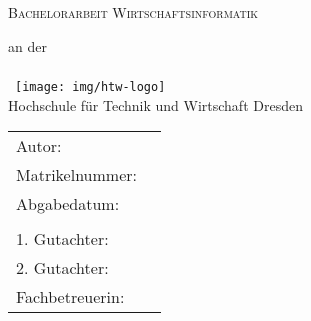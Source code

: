 \begin{titlepage}
\pagestyle{empty}

\hspace{1cm}\\
\,
\vspace{1cm}

\centering

	{
		\scshape
			\Huge \projektname{}
		\par
	}

\vspace{2cm}

{	\scshape	{\LARGE Bachelorarbeit Wirtschaftsinformatik} }

	\vspace{1mm}
	{		\small{an der}\\	}
	\hspace{1cm}\\
	\,
	\vspace{1em}
	{\texttt{[image: img/htw-logo]}
\\%
	{	\large	Hochschule für Technik und Wirtschaft Dresden\\ }
	}

\vfill
	\vspace{2em}


\begin{tabular}{ll}%
	Autor: & \Author{} \\
	Matrikelnummer: & \AuthorID{} \\
	Abgabedatum: & \DocDate{} \\
	& \\
	1. Gutachter: & \ReviewerA{} \\
	2. Gutachter: & \ReviewerB{} \\
	Fachbetreuerin: & \SupervisorA{} \\
	
\end{tabular}

\par

\newpage

\hspace{1cm}\\
\,
\vspace{1cm}

\par

\vspace{1em}

\par



\vfill

\centering


\CopyrightIMG{}

\hfill{}\Copyright{}\hfill{}\\
\CopyrightURL{}
\newpage

\end{titlepage}
